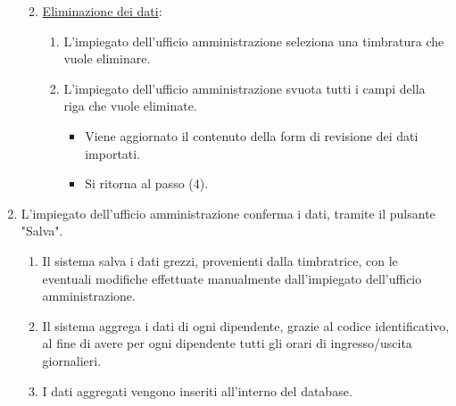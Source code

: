 \begin{enumerate}
\begin{enumerate}
\begin{enumerate}
				\end{enumerate}
			\item \underline{Eliminazione dei dati}:
				\begin{enumerate}
						\item L'impiegato dell'ufficio amministrazione seleziona una timbratura che vuole eliminare.
						\item L'impiegato dell'ufficio amministrazione svuota tutti i campi della riga che vuole eliminate.
							\begin{itemize}
								\item Viene aggiornato il contenuto della form di revisione dei dati importati.
								\item Si ritorna al passo (4).
							\end{itemize}
				\end{enumerate}
		\end{enumerate}
	\item L'impiegato dell'ufficio amministrazione conferma i dati, tramite il pulsante "Salva".
		\begin{enumerate}
			\item Il sistema salva i dati grezzi, provenienti dalla timbratrice, con le eventuali modifiche effettuate manualmente dall'impiegato dell'ufficio amministrazione.
			\item Il sistema aggrega i dati di ogni dipendente, grazie al codice identificativo, al fine di avere per ogni dipendente tutti gli orari di ingresso/uscita giornalieri.
			\item I dati aggregati vengono inseriti all'interno del database.
		\end{enumerate}	
\end{enumerate}
